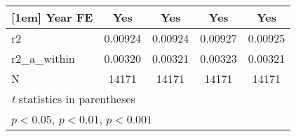{\begin{tabular}{l*{4}{c}}
[1em]
Year FE     &         Yes         &         Yes         &         Yes         &         Yes         \\
\hline
r2          &     0.00924         &     0.00924         &     0.00927         &     0.00925         \\
r2\_a\_within &     0.00320         &     0.00321         &     0.00323         &     0.00321         \\
N           &       14171         &       14171         &       14171         &       14171         \\
\hline\hline
\multicolumn{5}{l}{\footnotesize \textit{t} statistics in parentheses}\\
\multicolumn{5}{l}{\footnotesize \sym{*} \(p<0.05\), \sym{**} \(p<0.01\), \sym{***} \(p<0.001\)}\\
\end{tabular}
}
